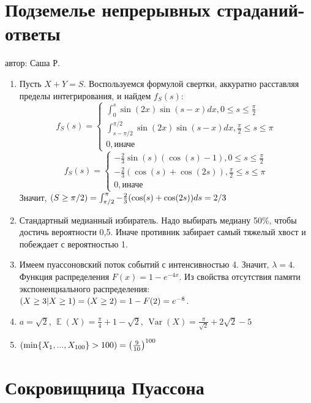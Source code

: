 \documentclass[a4paper,12pt]{article}
\DeclareMathOperator{\Var}{Var}
\DeclareMathOperator{\E}{\mathbb{E}}
\let\P\relax
\DeclareMathOperator{\P}{\mathbb{P}}
\begin{document}
\newpage
\section{Подземелье непрерывных страданий-ответы}
автор: Саша Р.

\begin{enumerate}
\item Пусть $X+Y=S$. Воспользуемся формулой свертки, аккуратно расставляя пределы интегрирования, и найдем $f_S(s)$:
    \[f_S(s)=\begin{cases}\int^s_0\sin(2x)\sin(s-x)dx,0\leq s\leq \frac{\pi}{2} \\
    \int^{\pi/2}_{s-\pi/2}\sin(2x)\sin(s-x)dx, \frac{\pi}{2} \leq s \leq \pi\\
    0, \mbox{иначе}
    \end{cases}\]
    \[f_S(s)=\begin{cases}-\frac{2}{3}\sin(s)(\cos(s)-1),0\leq s\leq \frac{\pi}{2} \\
    -\frac{2}{3}(\cos(s)+\cos(2s)), \frac{\pi}{2} \leq s \leq \pi\\
    0, \mbox{иначе}
    \end{cases}\]
    Значит, $\P(S\geq\pi/2)=\int^{\pi}_{\pi/2}-\frac{2}{3}(\cos(s)+\cos(2s))ds=2/3$
\item Стандартный медианный избиратель. Надо выбирать медиану 50\%, чтобы достичь вероятности 0,5. Иначе противник забирает самый тяжелый хвост и побеждает с вероятностью 1.
\item Имеем пуассоновский поток событий с интенсивностью 4. Значит, $\lambda=4$. Функция распределения $F(x)=1-e^{-4x}$. Из свойства отсутствия памяти экспоненциального распределения: $\P(X\geq3|X\geq1)=\P(X\geq2)=1-F(2)=e^{-8}$.
\item $a=\sqrt{2}$, $\E(X)=\frac{\pi}{4}+1-\sqrt{2}$, $\Var(X)=\frac{\pi}{\sqrt{2}}+2\sqrt{2}-5$
\item $\P(\min\{X_1,...,X_{100}\}>100)=\left(\frac{9}{10}\right)^{100}$
\end{enumerate}






\newpage
\section{Сокровищница Пуассона}
\end{document}
